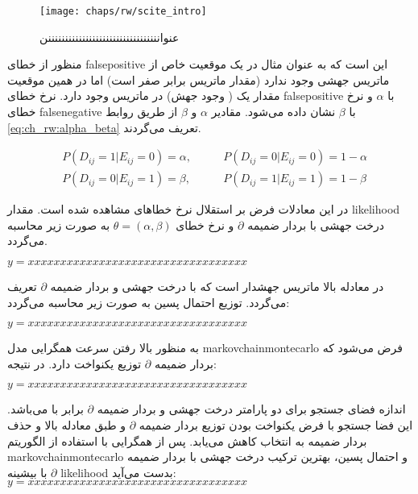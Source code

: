 \begin{figure}[!ht]
	\centerline{\texttt{[image: chaps/rw/scite\_intro]}}
	\caption{عنوانننننننننننننننننننننننننننننننننن}
	\label{fig:ch_rw:scite_intro}
\end{figure}



 منظور از خطای \gls{falsepositive} این است که به عنوان مثال در یک موقعیت خاص از ماتریس  جهشی وجود ندارد (مقدار ماتریس برابر صفر است) اما در همین موقعیت مقدار یک ( وجود جهش) در ماتریس  وجود دارد. نرخ خطای \gls{falsepositive} با  $\alpha$ و نرخ خطای \gls{falsenegative} با $\beta$ نشان داده می‌شود. مقادیر $\alpha$ و $\beta$ از طریق روابط \ref{eq:ch_rw:alpha_beta} تعریف می‌گردند.
 
\begin{equation}
	\begin{aligned}
		&P(D_{ij}=1|E_{ij}=0)=\alpha, &\qquad P(D_{ij}=0|E_{ij}=0)=1-\alpha \\ &P(D_{ij}=0|E_{ij}=1)=\beta, &\qquad P(D_{ij}=1|E_{ij}=1)=1-\beta
	\end{aligned}
	\label{eq:ch_rw:alpha_beta}
\end{equation}

 در این معادلات فرض بر استقلال نرخ خطاهای مشاهده شده است. مقدار \gls{likelihood} درخت جهشی  با بردار ضمیمه $\partial$ و نرخ خطای $\theta = (\alpha, \beta)$ به صورت زیر محاسبه می‌گردد. 
 
 
 \begin{math}
 	y=xxxxxxxxxxxxxxxxxxxxxxxxxxxxxxxxxx
 \end{math}
 
 
 
 در معادله بالا  ماتریس جهشدار است که با درخت جهشی  و بردار ضمیمه $\partial$  تعریف می‌گردد. توزیع احتمال پسین به صورت زیر محاسبه می‌گردد: 

 \begin{math}
	y=xxxxxxxxxxxxxxxxxxxxxxxxxxxxxxxxxx
\end{math}

به منظور بالا رفتن سرعت همگرایی مدل \gls{markovchainmontecarlo} فرض می‌شود که بردار ضمیمه $\partial$ توزیع یکنواخت دارد. در نتیجه: 


 \begin{math}
	y=xxxxxxxxxxxxxxxxxxxxxxxxxxxxxxxxxx
\end{math}



اندازه فضای جستجو برای دو پارامتر درخت جهشی  و بردار ضمیمه $\partial$ برابر با  می‌باشد. این فضا جستجو با فرض یکنواخت بودن توزیع بردار ضمیمه $\partial$ و طبق معادله بالا و حذف بردار ضمیمه به  انتخاب کاهش می‌یابد. پس از همگرایی با استفاده از الگوریتم \gls{markovchainmontecarlo} و احتمال پسین، بهترین ترکیب درخت جهشی  با بردار ضمیمه $\partial$ با بیشینه \gls{likelihood} بدست می‌آید: 
 \begin{math}
	y=xxxxxxxxxxxxxxxxxxxxxxxxxxxxxxxxxx
\end{math}


